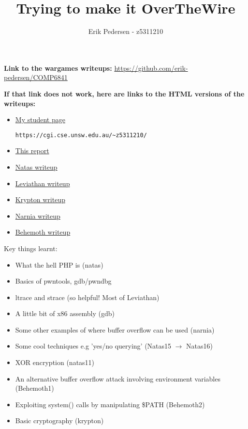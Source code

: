 \documentclass{article}
\title{Trying to make it OverTheWire}
\author{Erik Pedersen - z5311210}
\begin{document}
\maketitle

\textbf{Link to the wargames writeups:}
\url{https://github.com/erik-pedersen/COMP6841}

\textbf{If that link does not work, here are links to the HTML versions of the writeups:}
\begin{itemize}
	\item	\href{https://cgi.cse.unsw.edu.au/~z5311210/}{My student page} \begin{verbatim}https://cgi.cse.unsw.edu.au/~z5311210/\end{verbatim}
	\item	\href{https://cgi.cse.unsw.edu.au/~z5311210/submission/report.pdf}{This report} 
	\item	\href{https://cgi.cse.unsw.edu.au/~z5311210/natas/natas_writeup.html}{Natas writeup} 
	\item	\href{https://cgi.cse.unsw.edu.au/~z5311210/leviathan/leviathan_writeup.html}{Leviathan writeup} 
	\item	\href{https://cgi.cse.unsw.edu.au/~z5311210/krypton/krypton_writeup.html}{Krypton writeup} 
	\item	\href{https://cgi.cse.unsw.edu.au/~z5311210/narnia/narnia_writeup.html}{Narnia writeup} 
	\item	\href{https://cgi.cse.unsw.edu.au/~z5311210/behemoth/behemoth_writeup.html}{Behemoth writeup} 
\end{itemize}

Key things learnt:
\begin{itemize}
	\item What the hell PHP is (natas)
	\item Basics of pwntools, gdb/pwndbg
	\item ltrace and strace (so helpful! Most of Leviathan)
	\item A little bit of x86 assembly (gdb)
	\item Some other examples of where buffer overflow can be used (narnia)
	\item Some cool techniques e.g 'yes/no querying' (Natas15 $\to$ Natas16)
	\item XOR encryption (natas11)
	\item An alternative buffer overflow attack involving environment variables (Behemoth1)
	\item Exploiting system() calls by manipulating \$PATH (Behemoth2)
	\item Basic cryptography (krypton)
\end{itemize}
\end{document}
